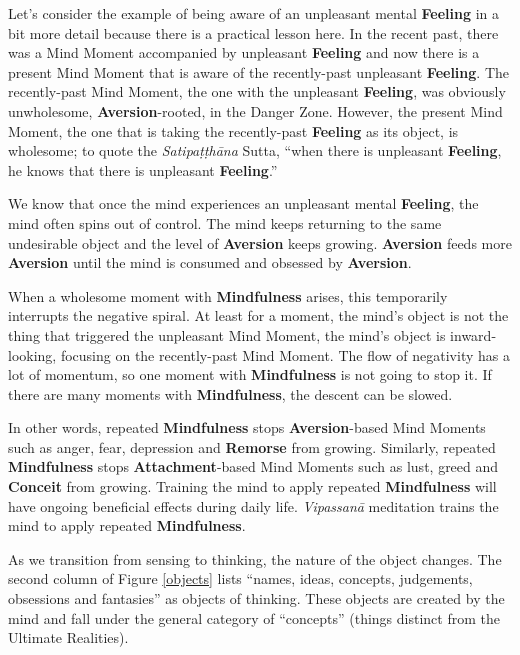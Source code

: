 \pagebreak

Let’s consider the example of being aware of an unpleasant mental \textbf{Feeling} in a bit more detail because there is a practical lesson here. In the recent past, there was a Mind Moment accompanied by unpleasant \textbf{Feeling} and now there is a present Mind Moment that is aware of the recently-past unpleasant \textbf{Feeling}. The recently-past Mind Moment, the one with the unpleasant \textbf{Feeling}, was obviously unwholesome, \textbf{Aversion}-rooted, in the Danger Zone. However, the present Mind Moment, the one that is taking the recently-past \textbf{Feeling} as its object, is wholesome; to quote the \textit{Satipaṭṭhāna} Sutta, “when there is unpleasant \textbf{Feeling}, he knows that there is unpleasant \textbf{Feeling}.”

We know that once the mind experiences an unpleasant mental \textbf{Feeling}, the mind often spins out of control. The mind keeps returning to the same undesirable object and the level of \textbf{Aversion} keeps growing. \textbf{Aversion} feeds more \textbf{Aversion} until the mind is consumed and obsessed by \textbf{Aversion}.

When a wholesome moment with \textbf{Mindfulness} arises, this temporarily interrupts the negative spiral. At least for a moment, the mind’s object is not the thing that triggered the unpleasant Mind Moment, the mind’s object is inward-looking, focusing on the recently-past Mind Moment. The flow of negativity has a lot of momentum, so one moment with \textbf{Mindfulness} is not going to stop it. If there are many moments with \textbf{Mindfulness}, the descent can be slowed.

In other words, repeated \textbf{Mindfulness} stops \textbf{Aversion}-based Mind Moments such as anger, fear, depression and \textbf{Remorse} from growing. Similarly, repeated \textbf{Mindfulness} stops \textbf{Attachment}-based Mind Moments such as lust, greed and \textbf{Conceit} from growing. Training the mind to apply repeated \textbf{Mindfulness} will have ongoing beneficial effects during daily life. \textit{Vipassanā} meditation trains the mind to apply repeated \textbf{Mindfulness}.

As we transition from sensing to thinking, the nature of the object changes. The second column of Figure \ref{objects} lists “names, ideas, concepts, judgements, obsessions and fantasies” as objects of thinking. These objects are created by the mind and fall under the general category of “concepts” (things distinct from the Ultimate Realities).

